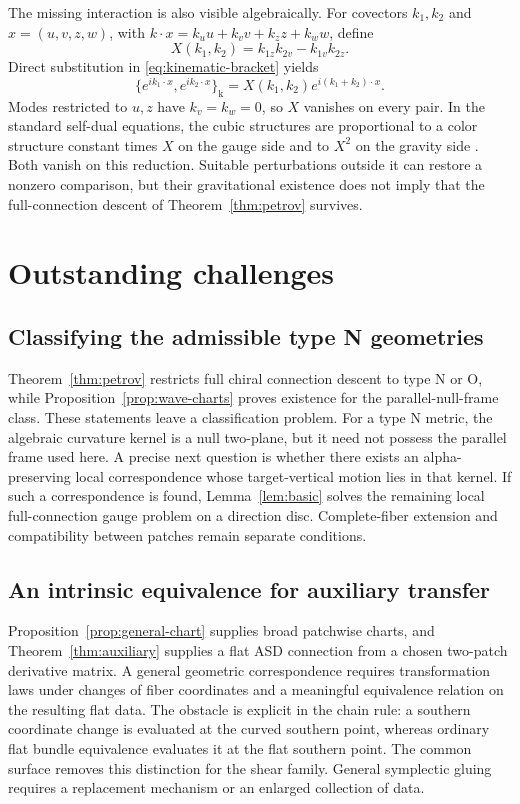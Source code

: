\documentclass[11pt]{article}
\numberwithin{equation}{section}
\theoremstyle{definition}
\theoremstyle{remark}
\begin{document}
The missing interaction is also visible algebraically. For covectors $k_1,k_2$ and $x=(u,v,z,w)$, with $k\cdot x=k_uu+k_vv+k_zz+k_ww$, define
\begin{equation}\label{eq:kinematic-X}
X(k_1,k_2)=k_{1z}k_{2v}-k_{1v}k_{2z}.
\end{equation}
Direct substitution in \eqref{eq:kinematic-bracket} yields
\[
\{e^{ik_1\cdot x},e^{ik_2\cdot x}\}_{\mathrm k}
=X(k_1,k_2)e^{i(k_1+k_2)\cdot x}.
\]
Modes restricted to $u,z$ have $k_v=k_w=0$, so $X$ vanishes on every pair. In the standard self-dual equations, the cubic structures are proportional to a color structure constant times $X$ on the gauge side and to $X^2$ on the gravity side \cite{MO,BGS}. Both vanish on this reduction. Suitable perturbations outside it can restore a nonzero comparison, but their gravitational existence does not imply that the full-connection descent of Theorem~\ref{thm:petrov} survives.
\section{Outstanding challenges}\label{sec:challenges}

\subsection{Classifying the admissible type N geometries}

Theorem~\ref{thm:petrov} restricts full chiral connection descent to type N or O, while Proposition~\ref{prop:wave-charts} proves existence for the parallel-null-frame class. These statements leave a classification problem. For a type N metric, the algebraic curvature kernel is a null two-plane, but it need not possess the parallel frame used here. A precise next question is whether there exists an alpha-preserving local correspondence whose target-vertical motion lies in that kernel. If such a correspondence is found, Lemma~\ref{lem:basic} solves the remaining local full-connection gauge problem on a direction disc. Complete-fiber extension and compatibility between patches remain separate conditions.

\subsection{An intrinsic equivalence for auxiliary transfer}

Proposition~\ref{prop:general-chart} supplies broad patchwise charts, and Theorem~\ref{thm:auxiliary} supplies a flat ASD connection from a chosen two-patch derivative matrix. A general geometric correspondence requires transformation laws under changes of fiber coordinates and a meaningful equivalence relation on the resulting flat data. The obstacle is explicit in the chain rule: a southern coordinate change is evaluated at the curved southern point, whereas ordinary flat bundle equivalence evaluates it at the flat southern point. The common surface removes this distinction for the shear family. General symplectic gluing requires a replacement mechanism or an enlarged collection of data.
\end{document}
